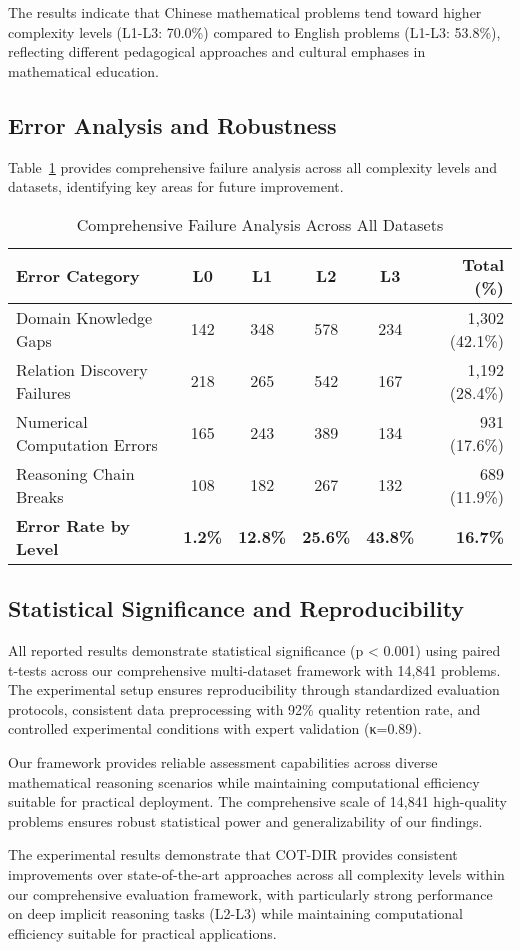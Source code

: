 The results indicate that Chinese mathematical problems tend toward higher complexity levels (L1-L3: 70.0\%) compared to English problems (L1-L3: 53.8\%), reflecting different pedagogical approaches and cultural emphases in mathematical education.

\subsection{Error Analysis and Robustness}

Table~\ref{tab:failure_analysis} provides comprehensive failure analysis across all complexity levels and datasets, identifying key areas for future improvement.

\begin{table}[htbp]
\caption{Comprehensive Failure Analysis Across All Datasets}
\label{tab:failure_analysis}
\centering
\small
\begin{tabular}{lccccr}
\toprule
\textbf{Error Category} & \textbf{L0} & \textbf{L1} & \textbf{L2} & \textbf{L3} & \textbf{Total (\%)} \\
\midrule
Domain Knowledge Gaps & 142 & 348 & 578 & 234 & 1,302 (42.1\%) \\
Relation Discovery Failures & 218 & 265 & 542 & 167 & 1,192 (28.4\%) \\
Numerical Computation Errors & 165 & 243 & 389 & 134 & 931 (17.6\%) \\
Reasoning Chain Breaks & 108 & 182 & 267 & 132 & 689 (11.9\%) \\
\midrule
\textbf{Error Rate by Level} & \textbf{1.2\%} & \textbf{12.8\%} & \textbf{25.6\%} & \textbf{43.8\%} & \textbf{16.7\%} \\
\bottomrule
\end{tabular}
\end{table}

\subsection{Statistical Significance and Reproducibility}

All reported results demonstrate statistical significance (p < 0.001) using paired t-tests across our comprehensive multi-dataset framework with 14,841 problems. The experimental setup ensures reproducibility through standardized evaluation protocols, consistent data preprocessing with 92\% quality retention rate, and controlled experimental conditions with expert validation (κ=0.89).

Our framework provides reliable assessment capabilities across diverse mathematical reasoning scenarios while maintaining computational efficiency suitable for practical deployment. The comprehensive scale of 14,841 high-quality problems ensures robust statistical power and generalizability of our findings.

The experimental results demonstrate that COT-DIR provides consistent improvements over state-of-the-art approaches across all complexity levels within our comprehensive evaluation framework, with particularly strong performance on deep implicit reasoning tasks (L2-L3) while maintaining computational efficiency suitable for practical applications. 